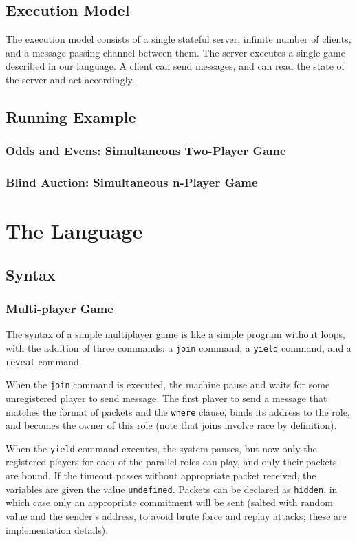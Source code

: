 \documentclass[acmsmall,review,anonymous]{acmart}\settopmatter{printfolios=true,printccs=false,printacmref=false}
\begin{document}
\subsection{Execution Model}
The execution model consists of a single stateful server, infinite number of clients, and a message-passing channel between them.
The server executes a single game described in our language. A client can send messages, and can read the state of the server and act accordingly.

\subsection{Running Example}
\subsubsection{Odds and Evens: Simultaneous Two-Player Game}

\subsubsection{Blind Auction: Simultaneous n-Player Game}

\section{The Language}

\subsection{Syntax}

\subsubsection{Multi-player Game}
The syntax of a simple multiplayer game is like a simple program without loops, with the addition of three commands: a \texttt{join} command, a \texttt{yield} command, and a \texttt{reveal} command.

When the \texttt{join} command is executed, the machine pause and waits for some unregistered player to send message. The first player to send a message that matches the format of packets and the \texttt{where} clause, binds its address to the role, and becomes the owner of this role (note that joins involve race by definition).

When the \texttt{yield} command executes, the system pauses, but now only the registered players for each of the parallel roles can play, and only their packets are bound. If the timeout passes without appropriate packet received, the variables are given the value \texttt{undefined}. Packets can be declared as \texttt{hidden}, in which case only an appropriate commitment will be sent (salted with random value and the sender's address, to avoid brute force and replay attacks; these are implementation details).
\end{document}
